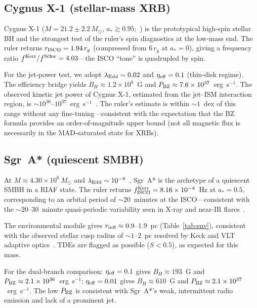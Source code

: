 \documentclass[11pt]{article}
\begin{document}
\subsection{Cygnus X-1 (stellar-mass XRB)}

Cygnus X-1 ($M=21.2\pm 2.2\,M_\odot$, $a_*\gtrsim 0.95$;~\cite{MillerJones2021,Zhao2021}) is the prototypical high-spin stellar BH and the strongest test of the ruler's spin diagnostics at the low-mass end.
The ruler returns $r_{\rm ISCO} = 1.94\,r_g$ (compressed from $6\,r_g$ at $a_*=0$), giving a frequency ratio $f^{\rm Kerr}/f^{\rm Schw}=4.03$---the ISCO ``tone'' is quadrupled by spin.

For the jet-power test, we adopt $\lambda_{\rm Edd}=0.02$ and $\eta_{\rm eff}=0.1$ (thin-disk regime).
The efficiency bridge yields $B_H \approx 1.2\times 10^8$~G and $P_{\rm BZ}\approx 7.6\times 10^{37}$~erg~s$^{-1}$.
The observed kinetic jet power of Cygnus X-1, estimated from the jet--ISM interaction region, is $\sim 10^{36}$--$10^{37}$~erg~s$^{-1}$~\cite{Gallo2005,Russell2007}.
The ruler's estimate is within $\sim 1$~dex of this range without any fine-tuning---consistent with the expectation that the BZ formula provides an order-of-magnitude upper bound (not all magnetic flux is necessarily in the MAD-saturated state for XRBs).

\subsection{Sgr~A* (quiescent SMBH)}

At $M\approx 4.30\times 10^6\,M_\odot$ and $\lambda_{\rm Edd}\sim 10^{-8}$~\cite{Gravity2020,EHT2022SgrA1}, Sgr~A* is the archetype of a quiescent SMBH in a RIAF state.
The ruler returns $f_{\rm ISCO}^{\rm Kerr}=8.16\times 10^{-4}$~Hz at $a_*=0.5$, corresponding to an orbital period of $\sim 20$~minutes at the ISCO---consistent with the $\sim 20$--$30$~minute quasi-periodic variability seen in X-ray and near-IR flares~\cite{Genzel2003,Gravity2018}.

The environmental module gives $r_{\rm infl}\approx 0.9$--$1.9$~pc (Table~\ref{tab:env}), consistent with the observed stellar cusp radius of $\sim 1$--$2$~pc resolved by Keck and VLT adaptive optics~\cite{Gravity2020}.
TDEs are flagged as possible ($S<0.5$), as expected for this mass.

For the dual-branch comparison: $\eta_{\rm eff}=0.1$ gives $B_H\approx 193$~G and $P_{\rm BZ}\approx 2.1\times 10^{36}$~erg~s$^{-1}$; $\eta_{\rm eff}=0.01$ gives $B_H\approx 610$~G and $P_{\rm BZ}\approx 2.1\times 10^{37}$~erg~s$^{-1}$.
The low $P_{\rm BZ}$ is consistent with Sgr~A*'s weak, intermittent radio emission and lack of a prominent jet.
\end{document}
